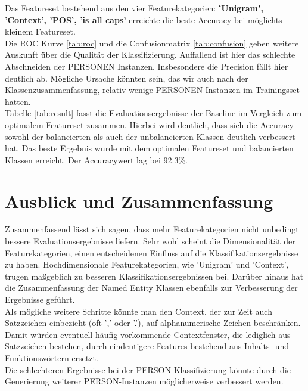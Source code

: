 \documentclass[bibliography=totoc]{scrartcl}
\begin{document}
	Das Featureset bestehend aus den vier Featurekategorien: \textbf{’Unigram’, ’Context’, ’POS’, ’is all caps’} erreichte die beste Accuracy bei möglichts kleinem Featureset.\\
	Die ROC Kurve \ref{tab:roc} und die Confusionmatrix \ref{tab:confusion} geben weitere Auskunft über die Qualität der Klassifizierung. Auffallend ist hier das schlechte Abschneiden der PERSONEN Instanzen. Insbesondere die Precision fällt hier deutlich ab. Mögliche Ursache könnten sein, das wir auch nach der Klassenzusammenfassung, relativ wenige PERSONEN Instanzen im Trainingsset hatten.\\
	
	Tabelle \ref{tab:result} fasst die Evaluationsergebnisse der Baseline im Vergleich zum  optimalem Featureset zusammen. Hierbei wird deutlich, dass sich die Accuracy sowohl der balancierten als auch der unbalancierten Klassen deutlich verbessert hat. Das beste Ergebnis wurde mit dem optimalen Featureset und balancierten Klassen erreicht. Der Accuracywert lag bei 92.3\%.
\section{Ausblick und Zusammenfassung}

	Zusammenfassend lässt sich sagen, dass mehr Featurekategorien nicht unbedingt bessere
	Evaluationsergebnisse liefern. Sehr wohl scheint die Dimensionalität der Featurekategorien, einen entscheidenen Einfluss auf die Klassifikationsergebnisse zu haben. Hochdimensionale Featurekategorien, wie 'Unigram' und 'Context', trugen
	maßgeblich zu besseren Klassifikationsergebnissen bei. Darüber hinaus hat die Zusammenfassung der Named Entity Klassen ebenfalls zur Verbesserung der Ergebnisse geführt.\\
	
	Als mögliche weitere Schritte könnte man den Context, der zur Zeit auch Satzzeichen einbezieht (oft ’,’ oder ’.’), auf alphanumerische Zeichen beschränken. Damit würden eventuell häufig vorkommende Contextfenster, die lediglich aus Satzzeichen bestehen, durch eindeutigere Features bestehend aus Inhalts- und Funktionswörtern ersetzt.\\
	
	Die schlechteren Ergebnisse bei der PERSON-Klassifizierung könnte durch die Generierung weiterer PERSON-Instanzen möglicherweise verbessert werden.
	
\end{document}
